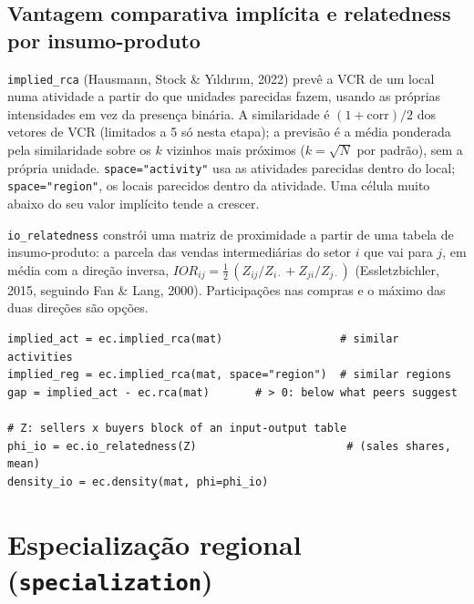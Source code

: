 \documentclass[12pt, a4paper]{article}
\newcommand{\fn}[1]{\texttt{#1}}
\begin{document}
\subsection{Vantagem comparativa impl\'{i}cita e relatedness por insumo-produto}

\begin{sloppypar}
\fn{implied\_rca} (Hausmann, Stock \& Y{\i}ld{\i}r{\i}m, 2022) prev\^{e} a
VCR de um local numa atividade a partir do que unidades parecidas fazem,
usando as pr\'{o}prias intensidades em vez da presen\c{c}a bin\'{a}ria. A
similaridade \'{e} $(1 + \text{corr})/2$ dos vetores de VCR (limitados a 5
s\'{o} nesta etapa); a previs\~{a}o \'{e} a m\'{e}dia ponderada pela
similaridade sobre os $k$ vizinhos mais pr\'{o}ximos ($k = \sqrt{N}$ por
padr\~{a}o), sem a pr\'{o}pria unidade. \texttt{space="activity"} usa as
atividades parecidas dentro do local; \texttt{space="region"}, os locais
parecidos dentro da atividade. Uma c\'{e}lula muito abaixo do seu valor
impl\'{i}cito tende a crescer.
\end{sloppypar}

\begin{sloppypar}
\fn{io\_relatedness} constr\'{o}i uma matriz de proximidade a partir de
uma tabela de insumo-produto: a parcela das vendas intermedi\'{a}rias do
setor $i$ que vai para $j$, em m\'{e}dia com a dire\c{c}\~{a}o inversa,
$IOR_{ij} = \tfrac12\,(Z_{ij}/Z_{i\cdot} + Z_{ji}/Z_{j\cdot})$
(Essletzbichler, 2015, seguindo Fan \& Lang, 2000). Participa\c{c}\~{o}es
nas compras e o m\'{a}ximo das duas dire\c{c}\~{o}es s\~{a}o op\c{c}\~{o}es.
\end{sloppypar}

\begin{lstlisting}[caption={VCR impl\'{i}cita e relatedness por insumo-produto}]
implied_act = ec.implied_rca(mat)                  # similar activities
implied_reg = ec.implied_rca(mat, space="region")  # similar regions
gap = implied_act - ec.rca(mat)       # > 0: below what peers suggest

# Z: sellers x buyers block of an input-output table
phi_io = ec.io_relatedness(Z)                       # (sales shares, mean)
density_io = ec.density(mat, phi=phi_io)
\end{lstlisting}

\section{Especializa\c{c}\~{a}o regional (\texttt{specialization})}
\end{document}
